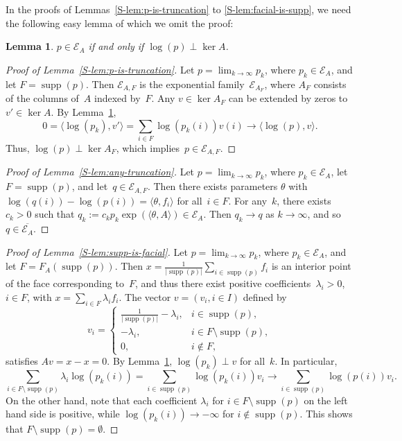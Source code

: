 \documentclass[aos,noinfoline]{imsart}
\newcommand{\face}{F}
\DeclareMathOperator{\supp}{supp}
\newcommand{\Ecal}{\mathcal{E}}
\newcommand{\ol}[1]{\overline{#1}}
\newtheorem{lemma}[theorem]{Lemma}
\theoremstyle{remark}
\theoremstyle{definition}
\begin{document}
In the proofs of Lemmas~\ref{S-lem:p-is-truncation} to \ref{S-lem:facial-is-supp}, we need the following easy lemma of which
we omit the proof:
\begin{lemma}
  \label{S-lem:implicit-ker}
  $p\in\Ecal_{A}$ if and only if $\log(p)\perp\ker A$.
\end{lemma}
\begin{proof}[Proof of Lemma~\ref{S-lem:p-is-truncation}]
  Let $p=\lim_{k\to\infty}p_{k}$, where $p_{k}\in\Ecal_{A}$, and let $F=\supp(p)$.  Then $\Ecal_{A,F}$ is the
  exponential family~$\Ecal_{A_{F}}$, where $A_{F}$ consists of the columns of~$A$ indexed by~$F$.  Any $v\in\ker A_{F}$
  can be extended by zeros to $v'\in\ker A$.  By Lemma~\ref{S-lem:implicit-ker},
  \begin{equation*}
    0 = \langle\log(p_{k}),v'\rangle = \sum_{i\in F}\log(p_{k}(i))v(i) \to \langle\log(p),v\rangle.
  \end{equation*}
  Thus, $\log(p)\perp\ker A_{F}$, which implies~$p\in\Ecal_{A,F}$.
\end{proof}
\begin{proof}[Proof of Lemma~\ref{S-lem:any-truncation}]
  Let $p=\lim_{k\to\infty}p_{k}$, where $p_{k}\in\Ecal_{A}$, let $F=\supp(p)$, and let~$q\in\Ecal_{A,F}$.  Then there
  exists parameters $\theta$ with $\log(q(i))-\log(p(i))=\langle \theta, f_{i}\rangle$ for all~$i\in F$.  For any~$k$,
  there exists $c_{k}>0$ such that $q_{k}:= c_{k}p_{k}\exp(\langle \theta, A\rangle)\in\Ecal_{A}$.
  Then $q_{k}\to q$ as $k\to\infty$, and so $q\in\ol{\Ecal_A}$.
\end{proof}
\begin{proof}[Proof of Lemma~\ref{S-lem:supp-is-facial}]
  Let $p=\lim_{k\to\infty}p_{k}$, where $p_{k}\in\Ecal_{A}$, and let $F=\face_{A}(\supp(p))$.
  Then $x=\frac{1}{|\supp(p)|}\sum_{i\in\supp(p)}f_{i}$ is an interior point of the face corresponding to~$F$, and thus
  there exist positive coefficients~$\lambda_{i}>0$, $i\in F$, with $x=\sum_{i\in F}\lambda_{i}f_{i}$.  The vector
  $v=(v_{i}, i\in I)$ defined by
  \begin{equation*}
    v_{i}=
    \begin{cases}
      \frac{1}{|\supp(p)|}-\lambda_{i}, & i\in\supp(p), \\
      -\lambda_{i}, & i\in F\setminus\supp(p), \\
      0, & i\notin F,
    \end{cases}
  \end{equation*}
  satisfies $Av=x-x=0$.
  By Lemma~\ref{S-lem:implicit-ker}, $\log(p_{k})\perp v$ for all~$k$.  In particular,
  \begin{equation*}
    \sum_{i\in F\setminus\supp(p)}\lambda_{i}\log(p_{k}(i)) = \sum_{i\in \supp(p)}\log(p_{k}(i))v_{i}
    \to \sum_{i\in \supp(p)}\log(p(i))v_{i}.
  \end{equation*}
  On the other hand, note that each coefficient $\lambda_{i}$ for $i\in F\setminus\supp(p)$ on the left hand side is
  positive, while $\log(p_{k}(i))\to-\infty$ for $i\notin\supp(p)$.  This shows that $F\setminus\supp(p)=\emptyset$.
\end{proof}
\end{document}
